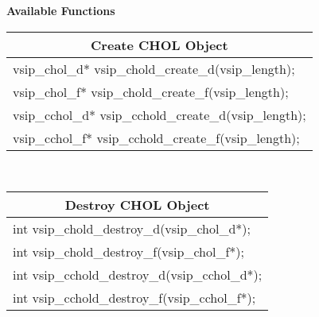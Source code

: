 \\\cvsiplh 
\\ \hspace*{.8cm} \vspace*{.1cm} \textbf{Available Functions }
%
\\ \hspace*{1.cm} {
\ttfamily\vspace{.3cm}
\begin{tabular}[H]{|l|}
\multicolumn{1}{c}{\rmfamily \bfseries Create CHOL Object\vspace{.1cm}}\\ \hline
vsip\_chol\_d* vsip\_chold\_create\_d(vsip\_length);\\
vsip\_chol\_f* vsip\_chold\_create\_f(vsip\_length);\\
vsip\_cchol\_d* vsip\_cchold\_create\_d(vsip\_length);\\
vsip\_cchol\_f* vsip\_cchold\_create\_f(vsip\_length);\\
\hline\end{tabular}\\}
\hspace*{1.cm} {
\ttfamily\vspace{.3cm}
\begin{tabular}[H]{|l|}
\multicolumn{1}{c}{\rmfamily \bfseries Destroy CHOL Object\vspace{.1cm}}\\ \hline
int vsip\_chold\_destroy\_d(vsip\_chol\_d*);\\
int vsip\_chold\_destroy\_f(vsip\_chol\_f*);\\
int vsip\_cchold\_destroy\_d(vsip\_cchol\_d*);\\
int vsip\_cchold\_destroy\_f(vsip\_cchol\_f*);\\
\hline\end{tabular}\\}
%
